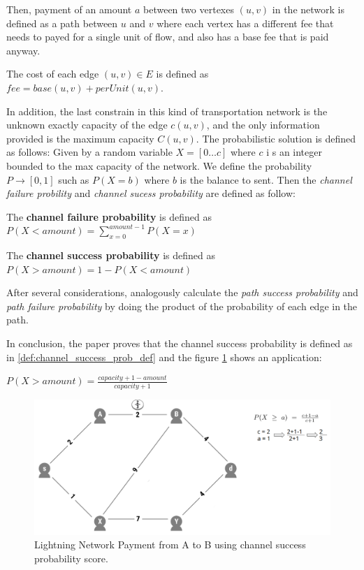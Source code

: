 Then, payment of an amount $a$ between two vertexes $(u, v)$ in the network is defined 
as a path between $u$ and $v$ where each vertex has a different fee that needs to payed for a 
single unit of flow, and also has a base fee that is paid anyway.

\begin{definition}
    The cost of each edge $(u, v) \in E$ is defined as $fee = base(u, v) + perUnit(u, v)$.
\end{definition}

In addition, the last constrain in this kind of transportation network is the 
unknown exactly capacity of the edge $c(u, v)$, and the only information provided 
is the maximum capacity $C(u, v)$.
The probabilistic solution is defined as follows: Given by a random variable $X = [0 \dots c]$ where $c$ i
s an integer bounded to the max capacity of the network. We define the probability 
$P \rightarrow [0, 1]$ such as $P(X = b)$ where $b$ is the balance to sent.
Then the \emph{channel failure probility} and \emph{channel sucess probability} are defined as follow:

\begin{definition}
   The {\bf channel failure probability} is defined as $P(X < amount) = \sum_{x = 0}^{amount - 1} P(X = x)$ 
\end{definition}

\begin{definition}
    The {\bf channel success probability} is defined as $P(X > amount) = 1 -  P(X < amount)$
\end{definition}

After several considerations, analogously calculate the \emph{path success probability} and
\emph{path failure probability} by doing the product of the probability of each edge in the path.

In conclusion, the paper proves that the channel success probability is defined as in 
\ref{def:channel_success_prob_def} and the figure \ref{fig:channel_success_prob_score}
shows an application: 

\begin{definition}
\label{def:channel_success_prob_def}
    $P(X > amount) = \frac{capacity + 1 - amount}{capacity + 1}$
\end{definition}


\begin{figure}[h]
  \begin{center}
  \includegraphics[width=0.6\columnwidth]{imgs/mincost_rene1.png}
  \end{center}
  \caption{Lightning Network Payment from A to B using channel success probability score.} 
  \label{fig:channel_success_prob_score}
\end{figure}


